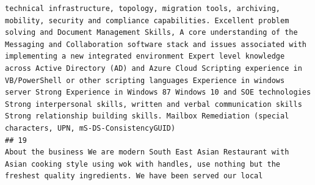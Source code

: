 \documentclass[11pt,a4paper,]{article}
\begin{document}
\begin{verbatim}
technical infrastructure, topology, migration tools, archiving, mobility, security and compliance capabilities. Excellent problem solving and Document Management Skills, A core understanding of the Messaging and Collaboration software stack and issues associated with implementing a new integrated environment Expert level knowledge across Active Directory (AD) and Azure Cloud Scripting experience in VB/PowerShell or other scripting languages Experience in windows server Strong Experience in Windows 87 Windows 10 and SOE technologies Strong interpersonal skills, written and verbal communication skills Strong relationship building skills. Mailbox Remediation (special characters, UPN, mS-DS-ConsistencyGUID)
## 19                                                                                                                                                                                                                                                                                                                                                                                                                                                                                                                                                                                                                                                                                                                                                                                                                                                                                                                                                                                                                                                                                                                                                                                                                                                                                                                                                                                                                                                                                                                                                                                                                                                                                                                                                                                                                                                                                                                                                                                                                                                                                                                                                                                                                                                                                                                                                                                                                                                                                                  About the business We are modern South East Asian Restaurant with Asian cooking style using wok with handles, use nothing but the freshest quality ingredients. We have been served our local 
\end{verbatim}
\end{document}
